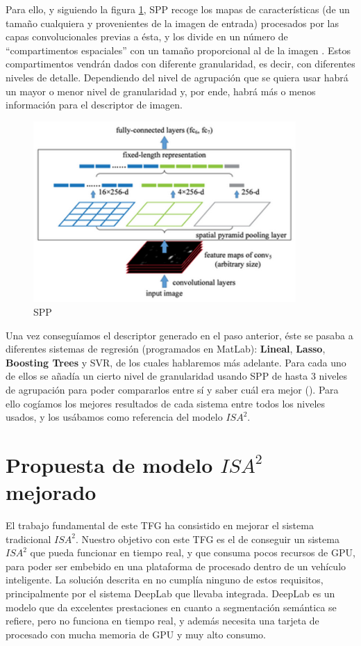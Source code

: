 Para ello, y siguiendo la figura \ref{fig:spp}, \ac{SPP} recoge los mapas de características (de un tamaño cualquiera y provenientes de la imagen de entrada) procesados por las capas convolucionales previas a ésta, y los divide en un número de ``compartimentos espaciales'' con un tamaño proporcional al de la imagen \cite{spp2}. Estos compartimentos vendrán dados con diferente granularidad, es decir, con diferentes niveles de detalle. Dependiendo del nivel de agrupación que se quiera usar habrá un mayor o menor nivel de granularidad y, por ende, habrá más o menos información para el descriptor de imagen.


\begin{figure}[H]
\centering
\includegraphics[width=10cm]{Figuras/SPP.eps}
\caption{\ac{SPP}}
\label{fig:spp}
\end{figure}


Una vez conseguíamos el descriptor generado en el paso anterior, éste se pasaba a diferentes sistemas de regresión (programados en MatLab): \textbf{Lineal}, \textbf{Lasso}, \textbf{Boosting Trees} y \ac{SVR}, de los cuales hablaremos más adelante. Para cada uno de ellos se añadía un cierto nivel de granularidad usando \ac{SPP} de hasta 3 niveles de agrupación para poder compararlos entre sí y saber cuál era mejor (\cite{isa2}). Para ello cogíamos los mejores resultados de cada sistema entre todos los niveles usados, y los usábamos como referencia del modelo $ISA^{2}$.


\section{Propuesta de modelo $ISA^{2}$ mejorado}
\label{sec:isa2_modelo_nuevo}
El trabajo fundamental de este TFG ha consistido en mejorar el sistema tradicional $ISA^{2}$. Nuestro objetivo con este TFG es el de conseguir un sistema $ISA^{2}$ que pueda funcionar en tiempo real, y que consuma pocos recursos de GPU, para poder ser embebido en una plataforma de procesado dentro de un vehículo inteligente. La solución descrita en \cite{isa2} no cumplía ninguno de estos requisitos, principalmente por el sistema DeepLab que llevaba integrada. DeepLab es un modelo que da excelentes prestaciones en cuanto a segmentación semántica se refiere, pero no funciona en tiempo real, y además necesita una tarjeta de procesado con mucha memoria de GPU y muy alto consumo.

